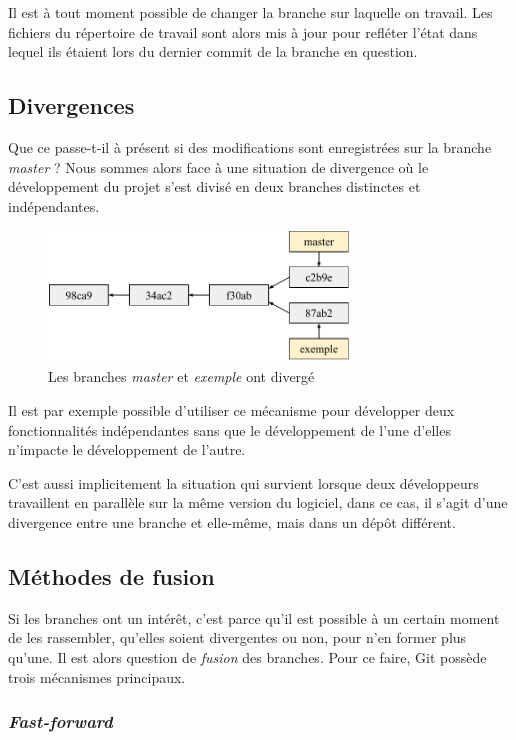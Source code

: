 \documentclass[11pt,a4paper]{article}
\begin{document}
Il est à tout moment possible de changer la branche sur laquelle on travail. Les fichiers du répertoire de travail sont alors mis à jour pour refléter l'état dans lequel ils étaient lors du dernier commit de la branche en question.

\subsection{Divergences}

Que ce passe-t-il à présent si des modifications sont enregistrées sur la branche \textit{master} ? Nous sommes alors face à une situation de divergence où le développement du projet s'est divisé en deux branches distinctes et indépendantes.

\begin{figure}[h]
\begin{center}
\includegraphics[width=8cm]{img_divergence}
\caption{Les branches \textit{master} et \textit{exemple} ont divergé}
\end{center}
\end{figure}

Il est par exemple possible d'utiliser ce mécanisme pour développer deux fonctionnalités indépendantes sans que le développement de l'une d'elles n'impacte le développement de l'autre.

C'est aussi implicitement la situation qui survient lorsque deux développeurs travaillent en parallèle sur la même version du logiciel, dans ce cas, il s'agit d'une divergence entre une branche et elle-même, mais dans un dépôt différent.

\subsection{Méthodes de fusion}

Si les branches ont un intérêt, c'est parce qu'il est possible à un certain moment de les rassembler, qu'elles soient divergentes ou non, pour n'en former plus qu'une. Il est alors question de \textit{fusion} des branches. Pour ce faire, Git possède trois mécanismes principaux.

\subsubsection{\textit{Fast-forward}}
\end{document}
